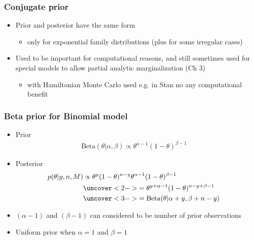 \documentclass[english,t]{beamer}
\begin{document}
\begin{frame}

  \frametitle{Conjugate prior}

  \begin{itemize}
  \item Prior and posterior have the same form
    \begin{itemize}
    \item only for exponential family distributions (plus for
      some irregular cases)
    \end{itemize}
  \item Used to be important for computational reasons, and still
    sometimes used for special models to allow partial analytic
    marginalization (Ch 3)
    \begin{itemize}
    \item with Hamiltonian Monte Carlo used e.g. in Stan no any
      computational benefit
    \end{itemize}
  \end{itemize}
  
\end{frame}

\begin{frame}

  \frametitle{Beta prior for Binomial model}

  \begin{itemize}
  \item Prior \baselineskip
    \begin{align*}
      \text{Beta}(\theta|\alpha,\beta) \propto \theta^{\alpha-1}
      (1-\theta)^{\beta-1}
    \end{align*}
  \item Posterior
    \baselineskip
    \begin{align*}
      p(\theta|y,n,M) & \propto \theta^y(1-\theta)^{n-y}
      \theta^{\alpha-1} (1-\theta)^{\beta-1}\\
      &\uncover<2->{ =
      \theta^{y+\alpha-1} (1-\theta)^{n-y+\beta-1}}\\
      &\uncover<3->{ = \text{Beta}(\theta|\alpha+y,\beta+n-y)}
    \end{align*}
    \vskip -2mm
  \item<4-> $(\alpha-1)$ and $(\beta-1)$ can considered to be number of prior observations
  \item<4-> Uniform prior when $\alpha=1$ and $\beta=1$ 
  \end{itemize}
\end{frame}
\end{document}
